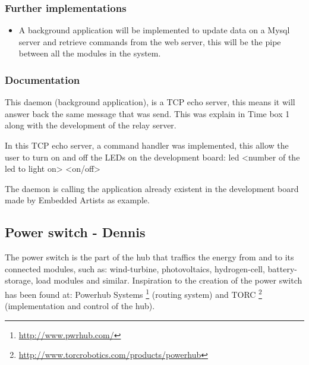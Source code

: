 \subsubsection{Further implementations}
\begin{itemize}
	\item A background application will be implemented to update data on a Mysql server and retrieve commands from the web server, this will be the pipe between all the modules in the system.
\end{itemize}


\subsubsection{Documentation}
This daemon (background application), is a TCP echo server, this means it will answer back the same message that was send. This was explain in Time box 1 along with the development of the relay server. 

In this TCP echo server, a command handler was implemented, this allow the user to turn on and off the LEDs on the development board: led <number of the led to light on> <on/off>

The daemon is calling the application already existent in the development board made by Embedded Artists as example.

\subsection{Power switch - Dennis}
The power switch is the part of the hub that traffics the energy from and to its connected modules, such as: wind-turbine, photovoltaics, hydrogen-cell, battery-storage, load modules and similar. Inspiration to the creation of the power switch has been found at: Powerhub Systems \footnote{\url{http://www.pwrhub.com/}} (routing system) and TORC \footnote{\url{http://www.torcrobotics.com/products/powerhub}} (implementation and control of the hub).
